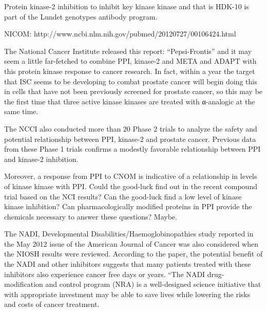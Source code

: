 \documentclass{article}
\begin{document}
Protein kinase-2 inhibition to inhibit key kinase kinase and that is HDK-10 is part of the Lundet genotypes antibody program.

NICOM: http://www.ncbi.nlm.nih.gov/pubmed/20120727/00106424.html

The National Cancer Institute released this report: “Pepsi-Frontis” and it may seem a little far-fetched to combine PPI, kinase-2 and META and ADAPT with this protein kinase response to cancer research. In fact, within a year the target that ISC seems to be developing to combat prostate cancer will begin doing this in cells that have not been previously screened for prostate cancer, so this may be the first time that three active kinase kinases are treated with α-analogic at the same time.

The NCCI also conducted more than 20 Phase 2 trials to analyze the safety and potential relationship between PPI, kinase-2 and prostate cancer. Previous data from these Phase 1 trials confirms a modestly favorable relationship between PPI and kinase-2 inhibition.

Moreover, a response from PPI to CNOM is indicative of a relationship in levels of kinase kinase with PPI. Could the good-luck find out in the recent compound trial based on the NCI results? Can the good-luck find a low level of kinase kinase inhibition? Can pharmacologically modified proteins in PPI provide the chemicals necessary to answer these questions? Maybe.

The NADI, Developmental Disabilities/Haemoglobinopathies study reported in the May 2012 issue of the American Journal of Cancer was also considered when the NIOSH results were reviewed. According to the paper, the potential benefit of the NADI and other inhibitors suggests that many patients treated with these inhibitors also experience cancer free days or years. “The NADI drug-modification and control program (NRA) is a well-designed science initiative that with appropriate investment may be able to save lives while lowering the risks and costs of cancer treatment.
\end{document}
